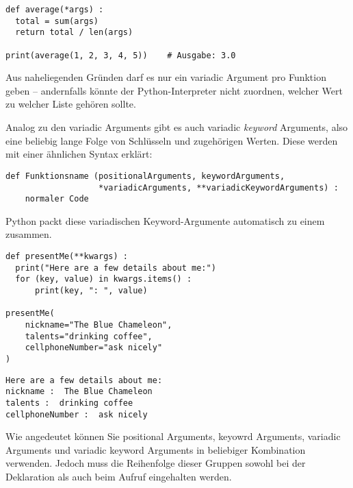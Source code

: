 \begin{codebox}
\begin{verbatim}
def average(*args) :
  total = sum(args)
  return total / len(args)

print(average(1, 2, 3, 4, 5))    # Ausgabe: 3.0
\end{verbatim}
\end{codebox}

Aus naheliegenden Gründen darf es nur ein variadic Argument pro Funktion geben -- andernfalls könnte der Python-Interpreter nicht zuordnen, welcher Wert zu welcher Liste gehören sollte.

Analog zu den variadic Arguments gibt es auch variadic \emph{keyword} Arguments, also eine beliebig lange Folge von Schlüsseln und zugehörigen Werten. Diese werden mit einer ähnlichen Syntax erklärt:

\begin{codebox}
\begin{verbatim}
def Funktionsname (positionalArguments, keywordArguments,
                   *variadicArguments, **variadicKeywordArguments) :
    normaler Code
\end{verbatim}
\end{codebox}

Python packt diese variadischen Keyword-Argumente automatisch zu einem  zusammen.

\begin{codebox}
\begin{verbatim}
def presentMe(**kwargs) :
  print("Here are a few details about me:")
  for (key, value) in kwargs.items() :
      print(key, ": ", value)

presentMe(
    nickname="The Blue Chameleon",
    talents="drinking coffee",
    cellphoneNumber="ask nicely"
)
\end{verbatim}
\end{codebox}
\begin{cmdbox}
\begin{verbatim}
Here are a few details about me:
nickname :  The Blue Chameleon
talents :  drinking coffee
cellphoneNumber :  ask nicely
\end{verbatim}
\end{cmdbox}

Wie angedeutet können Sie positional Arguments, keyowrd Arguments, variadic Arguments und variadic keyword Arguments in beliebiger Kombination verwenden. Jedoch muss die Reihenfolge dieser Gruppen sowohl bei der Deklaration als auch beim Aufruf eingehalten werden.


